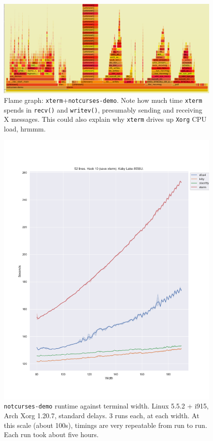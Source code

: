 \begin{figure}[!htb]
\centering
\includegraphics[width=1\textwidth]{media/fg-demo-xterm.png}
\caption[Flame graph: \texttt{xterm}+\texttt{notcurses-demo}.]
 {Flame graph: \texttt{xterm}+\texttt{notcurses-demo}. Note how much time
   \texttt{xterm} spends in \texttt{recv()} and \texttt{writev()}, presumably
 sending and receiving X messages. This could also explain why \texttt{xterm}
drives up \texttt{Xorg} CPU load, hrmmm\textellipsis .}
\label{fig:fg-demo-xterm}
\end{figure}

\begin{figure}[!htb]
\centering
\includegraphics[width=1\textwidth]{media/termsdemo.png}
\caption[Intel i7-8550U benchmarks, varying widths.]{\texttt{notcurses-demo} runtime against terminal width. Linux 5.5.2 + i915, Arch Xorg 1.20.7, standard delays. 3 runs each, at each width.
At this scale (about 100s), timings are very repeatable from run to run. Each run took about five hours.}
\label{fig:intel-full}
\end{figure}

